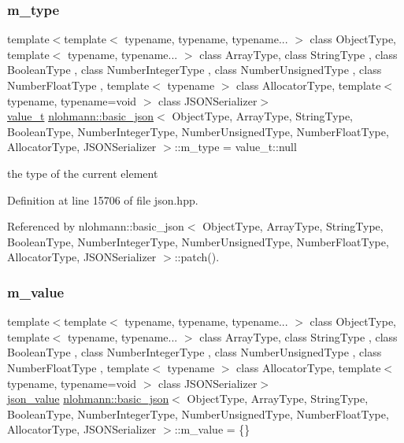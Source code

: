 \subsubsection{\texorpdfstring{m\+\_\+type}{m\_type}}
{\footnotesize\ttfamily template$<$template$<$ typename, typename, typename... $>$ class Object\+Type, template$<$ typename, typename... $>$ class Array\+Type, class String\+Type , class Boolean\+Type , class Number\+Integer\+Type , class Number\+Unsigned\+Type , class Number\+Float\+Type , template$<$ typename $>$ class Allocator\+Type, template$<$ typename, typename=void $>$ class J\+S\+O\+N\+Serializer$>$ \\
\hyperlink{namespacenlohmann_1_1detail_a1ed8fc6239da25abcaf681d30ace4985}{value\+\_\+t} \hyperlink{classnlohmann_1_1basic__json}{nlohmann\+::basic\+\_\+json}$<$ Object\+Type, Array\+Type, String\+Type, Boolean\+Type, Number\+Integer\+Type, Number\+Unsigned\+Type, Number\+Float\+Type, Allocator\+Type, J\+S\+O\+N\+Serializer $>$\+::m\+\_\+type = value\+\_\+t\+::null\hspace{0.3cm}{\ttfamily [private]}}



the type of the current element 



Definition at line 15706 of file json.\+hpp.



Referenced by nlohmann\+::basic\+\_\+json$<$ Object\+Type, Array\+Type, String\+Type, Boolean\+Type, Number\+Integer\+Type, Number\+Unsigned\+Type, Number\+Float\+Type, Allocator\+Type, J\+S\+O\+N\+Serializer $>$\+::patch().

\mbox{\label{classnlohmann_1_1basic__json_aeb0814f76966f99290cb29e127c90a77}} 
\subsubsection{\texorpdfstring{m\+\_\+value}{m\_value}}
{\footnotesize\ttfamily template$<$template$<$ typename, typename, typename... $>$ class Object\+Type, template$<$ typename, typename... $>$ class Array\+Type, class String\+Type , class Boolean\+Type , class Number\+Integer\+Type , class Number\+Unsigned\+Type , class Number\+Float\+Type , template$<$ typename $>$ class Allocator\+Type, template$<$ typename, typename=void $>$ class J\+S\+O\+N\+Serializer$>$ \\
\hyperlink{unionnlohmann_1_1basic__json_1_1json__value}{json\+\_\+value} \hyperlink{classnlohmann_1_1basic__json}{nlohmann\+::basic\+\_\+json}$<$ Object\+Type, Array\+Type, String\+Type, Boolean\+Type, Number\+Integer\+Type, Number\+Unsigned\+Type, Number\+Float\+Type, Allocator\+Type, J\+S\+O\+N\+Serializer $>$\+::m\+\_\+value = \{\}\hspace{0.3cm}{\ttfamily [private]}}




